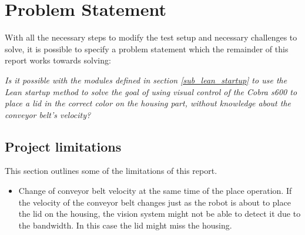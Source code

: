 \chapter{Problem Statement}
With all the necessary steps to modify the test setup and necessary challenges to solve, it is possible to specify a problem statement which the remainder of this report works towards solving:
\begin{center}
  \textit{Is it possible with the modules defined in section \ref{sub_lean_startup} to use the Lean startup method to solve the goal of using visual control of the Cobra s600 to place a lid in the correct color on the housing part, without knowledge about the conveyor belt's velocity?}
\end{center}
\section{Project limitations}
This section outlines some of the limitations of this report.
\begin{itemize}
  \item {}Change of conveyor belt velocity at the same time of the place operation. If the velocity of the conveyor belt changes just as the robot is about to place the lid on the housing, the vision system might not be able to detect it due to the bandwidth. In this case the lid might miss the housing. 
\end{itemize}
